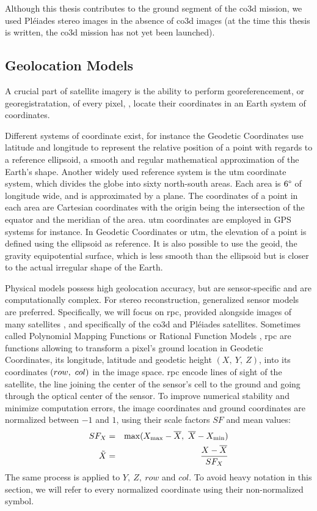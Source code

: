 Although this thesis contributes to the ground segment of the \acrshort{co3d} mission, we used Pléiades stereo images in the absence of \acrshort{co3d} images (at the time this thesis is written, the \acrshort{co3d} mission has not yet been launched).

\subsection{Geolocation Models}\label{sec:sensors_rpc}
A crucial part of satellite imagery is the ability to perform georeferencement, or georegistratation, of every pixel, \ie, locate their coordinates in an Earth system of coordinates.

Different systems of coordinate exist, for instance the Geodetic Coordinates use latitude and longitude to represent the relative position of a point with regards to a reference ellipsoid, \ie a smooth and regular mathematical approximation of the Earth's shape. Another widely used reference system is the \acrfull{utm} coordinate system, which divides the globe into sixty north-south areas. Each area is $6\degree$ of longitude wide, and is approximated by a plane. The coordinates of a point in each area are Cartesian coordinates with the origin being the intersection of the equator and the meridian of the area. \acrshort{utm} coordinates are employed in GPS systems for instance. In Geodetic Coordinates or \acrshort{utm}, the elevation of a point is defined using the ellipsoid as reference. It is also possible to use the geoid, \ie the gravity equipotential surface, which is less smooth than the ellipsoid but is closer to the actual irregular shape of the Earth.

Physical models possess high geolocation accuracy, but are sensor-specific and are computationally complex. For stereo reconstruction, generalized sensor models are preferred. Specifically, we will focus on \acrfull{rpc}, provided alongside images of many satellites \cite{grodecki_ikonos_2001,devika_developement_2006}, and specifically of the \acrshort{co3d} and Pléiades satellites. Sometimes called Polynomial Mapping Functions \cite{baltsavias_metric_1992} or Rational Function Models \cite{tao_comprehensive_2001}, \acrshort{rpc} are functions allowing to transform a pixel's ground location in Geodetic Coordinates, \ie its longitude, latitude and geodetic height $(X,~Y,~Z)$, into its coordinates $(row, ~col)$ in the image space. \acrshort{rpc} encode lines of sight of the satellite, \ie the line joining the center of the sensor's cell to the ground and going through the optical center of the sensor. To improve numerical stability and minimize computation errors, the image coordinates and ground coordinates are normalized between $-1$ and $1$, using their scale factors $SF$ and mean values:
\begin{eqnarray*}
    SF_X &=& \max(X_\mathrm{max}-\overline{X},~\overline{X}-X_\mathrm{min})\\
    \Tilde{X}&=&\frac{X-\overline{X}}{SF_X}
\end{eqnarray*}
The same process is applied to $Y, ~Z,~row$ and $col$. To avoid heavy notation in this section, we will refer to every normalized coordinate using their non-normalized symbol.

